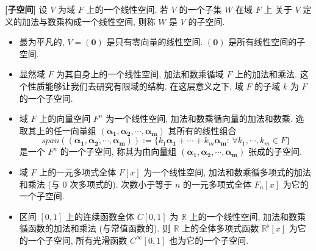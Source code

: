 \documentclass[UTF8]{book}
\begin{document}
\begin{definition}
    \textbf{[子空间]} 设 $V$ 为域 $F$ 上的一个线性空间. 
    若 $V$ 的一个子集 $W$ 在域 $F$ 上
    关于 $V$ 定义的加法与数乘构成一个线性空间, 
    则称 $W$ 是 $V$ 的子空间. 
\end{definition}

\begin{example}
    \begin{itemize}
        \item 最为平凡的, $V =(\boldsymbol{0})$ 是只有零向量的线性空间. 
        $(\boldsymbol{0})$ 是所有线性空间的子空间. 

        \item 显然域 $F$ 为其自身上的一个线性空间, 
        加法和数乘循域 $F$ 上的加法和乘法. 
        这个性质能够让我们去研究有限域的结构. 
        在这层意义之下, 域 $F$ 的子域 $k$ 为 $F$ 的一个子空间. 

        \item 域 $F$ 上的向量空间 $F^n$ 为一个线性空间, 
        加法和数乘循向量的加法和数乘. 
        选取其上的任一向量组 
        $(\boldsymbol{\alpha_1},\boldsymbol{\alpha_2},\cdots,
        \boldsymbol{\alpha_m})$ 其所有的线性组合 
        $$ span((\boldsymbol{\alpha_1},\boldsymbol{\alpha_2},\cdots,
        \boldsymbol{\alpha_m})):= 
        \{k_1\boldsymbol{\alpha_1}+\cdots+k_m\boldsymbol{\alpha_m}:\,
        \forall k_1,\cdots,k_m \in F\}$$ 
        是一个 $F^n$ 的一个子空间, 称其为由向量组 $(\boldsymbol{\alpha_1},\boldsymbol{\alpha_2},\cdots,
        \boldsymbol{\alpha_m})$ 张成的子空间. 

        \item 域 $F$ 上的一元多项式全体 $F[x]$ 为一个线性空间, 
        加法和数乘循多项式的加法和乘法 (与 0 次多项式的). 
        次数小于等于 $n$ 的一元多项式全体 $F_n[x]$ 为它的一个子空间. 

        \item 区间 $[0,1]$ 上的连续函数全体 $ C[0,1] $ 为
        $\mathbb{R}$ 上的一个线性空间, 
        加法和数乘循函数的加法和乘法 (与常值函数的). 
        则 $\mathbb{R}$ 上的全体多项式函数 $\mathbb{R}^\flat [x]$ 
        为它的一个子空间, 所有光滑函数 $C^{\infty}[0,1]$ 
        也为它的一个子空间. 

    \end{itemize}
\end{example}
\end{document}
